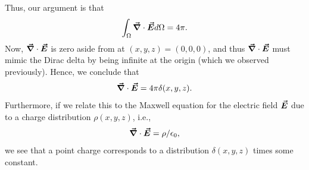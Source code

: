 \documentclass[12pt]{article} %
\begin{document}
\begin{solution}
    Thus, our argument is that
    \[
    \int_\Omega \boldsymbol{\vec{\nabla}} \cdot \boldsymbol{\vec{E}} d\Omega = 4\pi.
    \]
    Now, $\boldsymbol{\vec{\nabla}}\cdot \boldsymbol{\vec{E}}$ is zero aside from at $(x,y,z)=(0,0,0)$, and thus $\boldsymbol{\vec{\nabla}} \cdot \boldsymbol{\vec{E}}$ must mimic the Dirac delta by being infinite at the origin (which we observed previously).  Hence, we conclude that
    \[
    \boldsymbol{\vec{\nabla}} \cdot \boldsymbol{\vec{E}} = 4\pi \delta(x,y,z).
    \]
    Furthermore, if we relate this to the Maxwell equation for the electric field $\boldsymbol{\vec{E}}$ due to a charge distribution $\rho(x,y,z)$, i.e.,
    \[
    \boldsymbol{\vec{\nabla}} \cdot \boldsymbol{\vec{E}} = \rho/\epsilon_0,
    \]
    we see that a point charge corresponds to a distribution $\delta(x,y,z)$ times some constant.
\end{solution}
\end{document}

